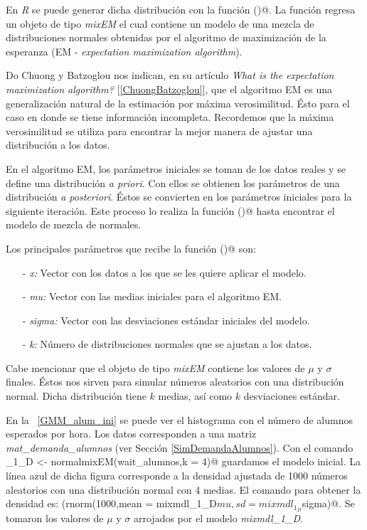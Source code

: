 En \textit{R} se puede generar dicha distribución con la función \verb@normalmixEM()@. La función regresa un objeto de tipo \textit{mixEM} el cual contiene un modelo de una mezcla de distribuciones normales obtenidas por el algoritmo de maximización de la esperanza (EM - \textit{expectation maximization algorithm}).

Do Chuong y Batzoglou nos indican, en su artículo \textit{What is the expectation maximization algorithm?} [\ref{ChuongBatzoglou}], que el algoritmo EM es una generalización natural de la estimación por máxima verosimilitud. Ésto para el caso en donde se tiene información incompleta. Recordemos que la máxima verosimilitud se utiliza para encontrar la mejor manera de ajustar una distribución a los datos.

En el algoritmo EM, los parámetros iniciales se toman de los datos reales y se define una distribución \textit{a priori}. Con ellos se obtienen los parámetros de una distribución \textit{a posteriori}. Éstos se convierten en los parámetros iniciales para la siguiente iteración. Este proceso lo realiza la función \verb@normalmixEM()@ hasta encontrar el modelo de mezcla de normales.

Los principales parámetros que recibe la función \verb@normalmixEM()@ son: 

\begin{itemize}
\item[-] \textit{x: } Vector con los datos a los que se les quiere aplicar el modelo.

\item[-] \textit{mu: } Vector con las medias iniciales para el algoritmo EM.

\item[-] \textit{sigma: } Vector con las desviaciones estándar iniciales del modelo.

\item[-] \textit{k: } Número de distribuciones normales que se ajustan a los datos.
\end{itemize}

Cabe mencionar que el objeto de tipo \textit{mixEM} contiene los valores de $\mu$ y $\sigma$ finales. Éstos nos sirven para simular números aleatorios con una distribución normal. Dicha distribución tiene $k$ medias, así como $k$ desviaciones estándar.

En la \figurename{~\ref{GMM_alum_ini}} se puede ver el histograma con el número de alumnos esperados por hora. Los datos corresponden a una matriz \textit{mat\_demanda\_alumnos} (ver Sección \ref{SimDemandaAlumnos}). Con el comando \verb@mixmdl_1_D <- normalmixEM(wait_alumnos,k = 4)@ guardamos el modelo inicial. La línea azul de dicha figura corresponde a la densidad ajustada de 1000 números aleatorios con una distribución normal con 4 medias. El comando para obtener la densidad es: \verb@density(rnorm(1000,mean = mixmdl_1_D$mu,sd = mixmdl_1_D$sigma)@. Se tomaron los valores de $\mu$ y $\sigma$ arrojados por el modelo \textit{mixmdl\_1\_D}.

